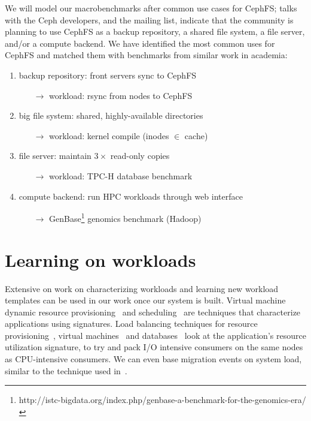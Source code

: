 We will model our macrobenchmarks after common use cases for CephFS; talks with the Ceph developers, and the mailing list, indicate that the community is planning to use CephFS as a backup repository, a shared file system, a file server, and/or a compute backend. We have identified the most common uses for CephFS and matched them with benchmarks from similar work in academia:
\begin{enumerate}
	\item backup repository: front servers sync to CephFS
	\begin{itemize}
		\item[\(\rightarrow\)] workload: rsync from nodes to CephFS~\cite{muthitacharoen:sosp2001-nfs}
	\end{itemize}
	\item big file system: shared, highly-available directories
	\begin{itemize}
		\item[\(\rightarrow\)] workload: kernel compile (inodes \(\in\) cache)~\cite{weil:phdthesis07}
	\end{itemize}
	\item file server: maintain \(3\times\) read-only copies
	\begin{itemize}
		\item[\(\rightarrow\)] workload: TPC-H database benchmark~\cite{roselli:atec2000-FS-workloads}
	\end{itemize}
	\item compute backend: run HPC workloads through web interface	
	\begin{itemize}
		\item[\(\rightarrow\)] GenBase\footnote{http://istc-bigdata.org/index.php/genbase-a-benchmark-for-the-genomics-era/} genomics benchmark (Hadoop)
	\end{itemize}
\end{enumerate}

\section{Learning on workloads}

Extensive on work on characterizing workloads and learning new workload templates can be used in our work once our system is built. Virtual machine dynamic resource provisioning~\cite{vilutis:ITI2012-cloud-load-balancing} and scheduling~\cite{quiroz:grid2009-cloud-workload-provisioning} are techniques that characterize applications using signatures. Load balancing techniques for resource provisioning~\cite{padala:eurosys2009-autocontrol}, virtual machines~\cite{wood:nsdi07-sandpiper} and databases~\cite{elmore:sigmod2013-pythia} look at the application's resource utilization signature, to try and pack I/O intensive consumers on the same nodes as CPU-intensive consumers. We can even base migration events on system load, similar to the technique used in~\cite{manjunath:ijais2012-paas-provisioing,vilutis:ITI2012-cloud-load-balancing}.

